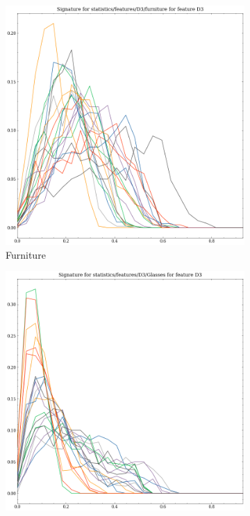 \begin{figure}[t!p]
    \begin{subfigure}[b]{0.23\textwidth}
        \includegraphics[width=\textwidth]{assets/feature_extraction/D3/furniture.png}
        \caption{Furniture}
    \end{subfigure}
    \hfill
    \begin{subfigure}[b]{0.23\textwidth}
        \includegraphics[width=\textwidth]{assets/feature_extraction/D3/Glasses.png}

\end{subfigure}
\end{figure}
